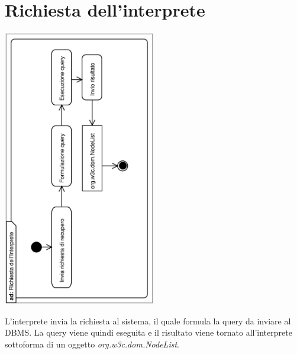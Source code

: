 \documentclass[11pt,titlepage,a4paper]{report}
\begin{document}
\section{Richiesta dell'interprete}
\begin{center}
 \includegraphics[width=0.5\textwidth, angle=-90]{RichiestadellInterprete.eps}
\end{center}
L'interprete invia la richiesta al sistema, il quale formula la query da inviare al DBMS. La query viene quindi eseguita e il risultato viene tornato all'interprete sottoforma di un oggetto \textit{org.w3c.dom.NodeList}.
\end{document}
